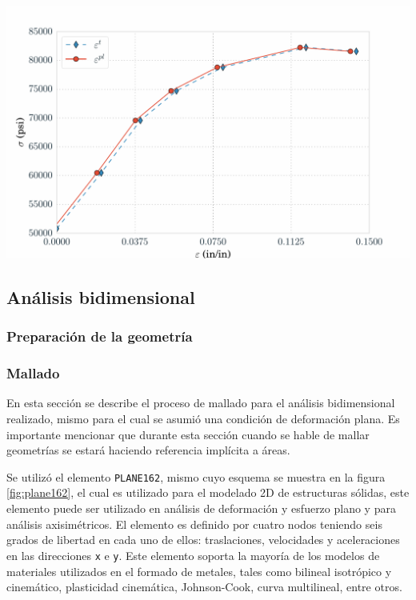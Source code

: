 \begin{center}
\includegraphics[scale=0.6]{src/ch3/ls_dyna_material_curve.pdf}
\label{fig:ls_dyna_material_curve}
\end{center}


\subsection{Análisis bidimensional}

\subsubsection{Preparación de la geometría}



\subsubsection{Mallado}

En esta sección se describe el proceso de mallado para el análisis bidimensional realizado, 
mismo para el cual se asumió una condición de deformación plana. Es importante mencionar 
que durante esta sección cuando se hable de mallar geometrías se estará haciendo referencia 
implícita a áreas.

Se utilizó el elemento \texttt{PLANE162}, mismo cuyo esquema se muestra en la figura \ref{fig:plane162}, 
el cual es utilizado para el modelado 2D de estructuras sólidas, este elemento puede ser utilizado en 
análisis de deformación y esfuerzo plano y para análisis axisimétricos. El elemento es definido por 
cuatro nodos teniendo seis grados de libertad en cada uno de ellos: traslaciones, velocidades y 
aceleraciones en las direcciones \texttt{x} e \texttt{y}. Este elemento soporta la mayoría de los modelos 
de materiales utilizados en el formado de metales, tales como bilineal isotrópico y cinemático, plasticidad 
cinemática, Johnson-Cook, curva multilineal, entre otros. \\

